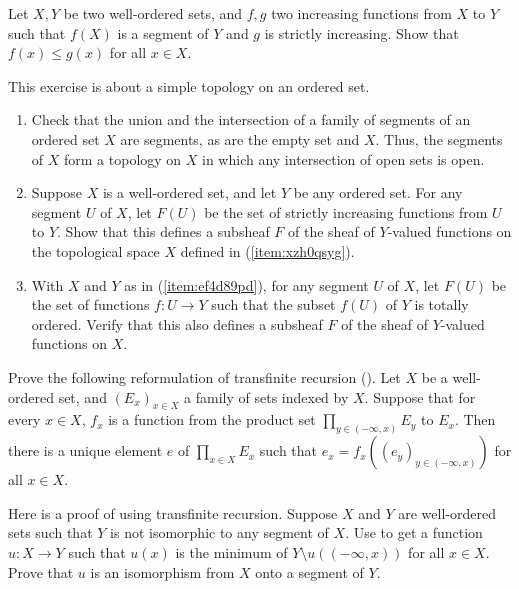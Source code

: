 \documentclass{article}
\begin{document}
\begin{exercise}
  \label{exe:gsdhavsp}
  Let \(X, Y\) be two well-ordered sets, and \(f, g\) two increasing
  functions from \(X\) to \(Y\) such that \(f(X)\) is a segment of
  \(Y\) and \(g\) is strictly increasing.  Show that
  \(f(x) \leq g(x)\) for all \(x \in X\).
\end{exercise}

\begin{exercise}
  \label{exe:rpm18mof}
  This exercise is about a simple topology on an ordered set.
  \begin{enumerate}
  \item \label{item:xzh0qsyg} Check that the union and the
    intersection of a family of segments of an ordered set \(X\) are
    segments, as are the empty set and \(X\).  Thus, the segments of
    \(X\) form a topology on \(X\) in which any intersection of open
    sets is open.
  \item \label{item:ef4d89pd} Suppose \(X\) is a well-ordered set, and
    let \(Y\) be any ordered set.  For any segment \(U\) of \(X\), let
    \(F(U)\) be the set of strictly increasing functions from \(U\) to
    \(Y\).  Show that this defines a subsheaf \(F\) of the sheaf of
    \(Y\)-valued functions on the topological space \(X\) defined in
    (\ref{item:xzh0qsyg}).
  \item With \(X\) and \(Y\) as in (\ref{item:ef4d89pd}), for any
    segment \(U\) of \(X\), let \(F(U)\) be the set of functions
    \(f : U \to Y\) such that the subset \(f(U)\) of \(Y\) is totally
    ordered.  Verify that this also defines a subsheaf \(F\) of the
    sheaf of \(Y\)-valued functions on \(X\).
  \end{enumerate}
\end{exercise}

\begin{exercise}
  \label{exe:oh59gz4i}
  Prove the following reformulation of transfinite recursion
  ().  Let \(X\) be a well-ordered set, and
  \((E_x)_{x \in X}\) a family of sets indexed by \(X\).  Suppose that
  for every \(x \in X\), \(f_x\) is a function from the product set
  \(\prod_{y \in (-\infty, x)} E_y\) to \(E_x\).  Then there is a
  unique element \(e\) of \(\prod_{x \in X} E_x\) such that
  \(e_x = f_x((e_y)_{y \in (-\infty, x)})\) for all \(x \in X\).
\end{exercise}

\begin{exercise}
  \label{exe:eghnwow2}
  Here is a proof of  using transfinite recursion.
  Suppose \(X\) and \(Y\) are well-ordered sets such that \(Y\) is not
  isomorphic to any segment of \(X\).  Use  to
  get a function \(u : X \to Y\) such that \(u(x)\) is the minimum of
  \(Y \setminus u((-\infty, x))\) for all \(x \in X\).  Prove that
  \(u\) is an isomorphism from \(X\) onto a segment of \(Y\).
\end{exercise}
\end{document}
